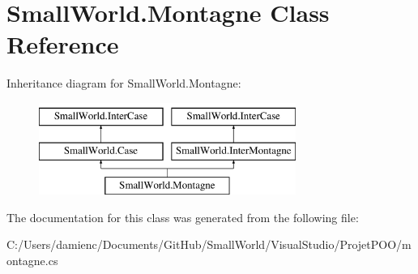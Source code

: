 \hypertarget{class_small_world_1_1_montagne}{\section{Small\-World.\-Montagne Class Reference}
\label{class_small_world_1_1_montagne}
}
Inheritance diagram for Small\-World.\-Montagne\-:\begin{figure}[H]
\begin{center}
\leavevmode
\includegraphics[height=3.000000cm]{class_small_world_1_1_montagne}
\end{center}
\end{figure}


The documentation for this class was generated from the following file\-:\begin{DoxyCompactItemize}
\item 
C\-:/\-Users/damienc/\-Documents/\-Git\-Hub/\-Small\-World/\-Visual\-Studio/\-Projet\-P\-O\-O/montagne.\-cs\end{DoxyCompactItemize}
